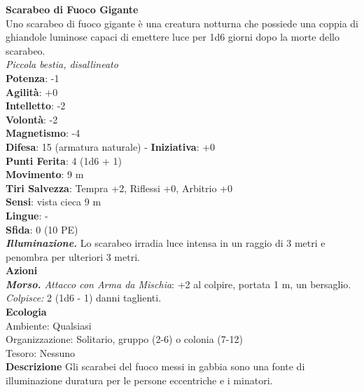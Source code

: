 \begin{multicols}{2}
\medskip\textbf{Scarabeo di Fuoco Gigante}\\
Uno scarabeo di fuoco gigante è una creatura notturna che possiede una coppia di ghiandole luminose capaci di emettere luce per 1d6 giorni dopo la morte dello scarabeo.\\
\emph{Piccola bestia, disallineato}\\
\textbf{Potenza}: -1\\
\textbf{Agilità}: +0\\
\textbf{Intelletto}: -2\\
\textbf{Volontà}: -2\\
\textbf{Magnetismo}: -4\\
\textbf{Difesa}: 15 (armatura naturale) - \textbf{Iniziativa}: +0\\
\textbf{Punti Ferita}: 4 (1d6 + 1)\\
\textbf{Movimento}: 9 m\\
\textbf{Tiri Salvezza}: Tempra +2, Riflessi +0, Arbitrio +0\\
\textbf{Sensi}: vista cieca 9 m\\
\textbf{Lingue}: -\\
\textbf{Sfida}: 0 (10 PE)\smallskip\\
\emph{\textbf{Illuminazione.}} Lo scarabeo irradia luce intensa in un raggio di 3 metri e penombra per ulteriori 3 metri.\\
\smallskip\textbf{Azioni}\\
\emph{\textbf{Morso.} Attacco con Arma da Mischia}: +2 al colpire, portata 1 m, un bersaglio.\\
\emph{Colpisce:} 2 (1d6 - 1) danni taglienti.\\
\textbf{Ecologia}\\
Ambiente: Qualsiasi\\
Organizzazione: Solitario, gruppo (2-6) o colonia (7-12)\\
Tesoro: Nessuno\\
\textbf{Descrizione}
Gli scarabei del fuoco messi in gabbia sono una fonte di illuminazione duratura per le persone eccentriche e i minatori.


\end{multicols}
